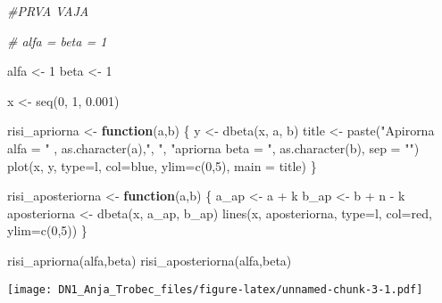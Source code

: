\documentclass[
]{article}
\newenvironment{Shaded}{\begin{snugshade}}{\end{snugshade}}
\newcommand{\AttributeTok}[1]{\textcolor[rgb]{0.77,0.63,0.00}{#1}}
\newcommand{\CommentTok}[1]{\textcolor[rgb]{0.56,0.35,0.01}{\textit{#1}}}
\newcommand{\ControlFlowTok}[1]{\textcolor[rgb]{0.13,0.29,0.53}{\textbf{#1}}}
\newcommand{\DecValTok}[1]{\textcolor[rgb]{0.00,0.00,0.81}{#1}}
\newcommand{\FloatTok}[1]{\textcolor[rgb]{0.00,0.00,0.81}{#1}}
\newcommand{\FunctionTok}[1]{\textcolor[rgb]{0.00,0.00,0.00}{#1}}
\newcommand{\NormalTok}[1]{#1}
\newcommand{\OtherTok}[1]{\textcolor[rgb]{0.56,0.35,0.01}{#1}}
\newcommand{\SpecialCharTok}[1]{\textcolor[rgb]{0.00,0.00,0.00}{#1}}
\newcommand{\StringTok}[1]{\textcolor[rgb]{0.31,0.60,0.02}{#1}}
\begin{document}
\begin{Shaded}
\begin{Highlighting}[]
\CommentTok{\#PRVA VAJA}

\CommentTok{\# alfa = beta = 1}

\NormalTok{alfa }\OtherTok{\textless{}{-}} \DecValTok{1}
\NormalTok{beta }\OtherTok{\textless{}{-}} \DecValTok{1}

\NormalTok{x }\OtherTok{\textless{}{-}} \FunctionTok{seq}\NormalTok{(}\DecValTok{0}\NormalTok{, }\DecValTok{1}\NormalTok{, }\FloatTok{0.001}\NormalTok{)}

\NormalTok{risi\_apriorna }\OtherTok{\textless{}{-}} \ControlFlowTok{function}\NormalTok{(a,b) \{}
\NormalTok{  y }\OtherTok{\textless{}{-}} \FunctionTok{dbeta}\NormalTok{(x, a, b)}
\NormalTok{  title }\OtherTok{\textless{}{-}} \FunctionTok{paste}\NormalTok{(}\StringTok{"Apirorna alfa = "}\NormalTok{ , }\FunctionTok{as.character}\NormalTok{(a),}\StringTok{", "}\NormalTok{, }\StringTok{"apriorna beta = "}\NormalTok{, }\FunctionTok{as.character}\NormalTok{(b), }\AttributeTok{sep =} \StringTok{""}\NormalTok{)}
  \FunctionTok{plot}\NormalTok{(x, y, }\AttributeTok{type=}\StringTok{\textquotesingle{}l\textquotesingle{}}\NormalTok{, }\AttributeTok{col=}\StringTok{\textquotesingle{}blue\textquotesingle{}}\NormalTok{, }\AttributeTok{ylim=}\FunctionTok{c}\NormalTok{(}\DecValTok{0}\NormalTok{,}\DecValTok{5}\NormalTok{), }\AttributeTok{main =}\NormalTok{ title)}
\NormalTok{\}}

\NormalTok{risi\_aposteriorna }\OtherTok{\textless{}{-}} \ControlFlowTok{function}\NormalTok{(a,b) \{}
\NormalTok{  a\_ap }\OtherTok{\textless{}{-}}\NormalTok{ a }\SpecialCharTok{+}\NormalTok{ k}
\NormalTok{  b\_ap }\OtherTok{\textless{}{-}}\NormalTok{ b }\SpecialCharTok{+}\NormalTok{ n }\SpecialCharTok{{-}}\NormalTok{ k}
\NormalTok{  aposteriorna }\OtherTok{\textless{}{-}} \FunctionTok{dbeta}\NormalTok{(x, a\_ap, b\_ap)}
  \FunctionTok{lines}\NormalTok{(x, aposteriorna, }\AttributeTok{type=}\StringTok{\textquotesingle{}l\textquotesingle{}}\NormalTok{, }\AttributeTok{col=}\StringTok{\textquotesingle{}red\textquotesingle{}}\NormalTok{, }\AttributeTok{ylim=}\FunctionTok{c}\NormalTok{(}\DecValTok{0}\NormalTok{,}\DecValTok{5}\NormalTok{))}
\NormalTok{\}}

\FunctionTok{risi\_apriorna}\NormalTok{(alfa,beta)}
\FunctionTok{risi\_aposteriorna}\NormalTok{(alfa,beta)}
\end{Highlighting}
\end{Shaded}

\texttt{[image: DN1\_Anja\_Trobec\_files/figure-latex/unnamed-chunk-3-1.pdf]}
\end{document}
